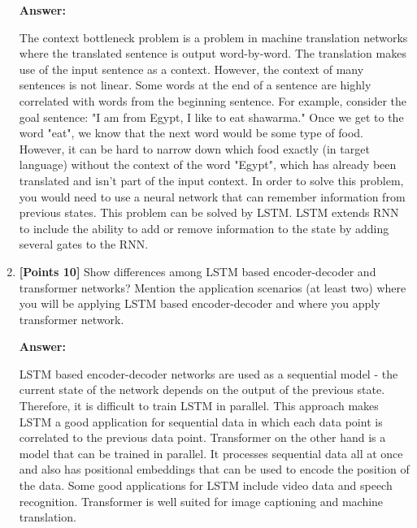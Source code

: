 \documentclass[12pt]{article}
\begin{document}
\begin{enumerate}
          \textbf{Answer:}

          The context bottleneck problem is a problem in machine translation
          networks where the translated sentence is output word-by-word. The
          translation makes use of the input sentence as a context. However, the
          context of many sentences is not linear. Some words at the end of a
          sentence are highly correlated with words from the beginning sentence.
          For example, consider the goal sentence: "I am from Egypt, I like to
          eat shawarma." Once we get to the word "eat", we know that the next
          word would be some type of food. However, it can be hard to narrow
          down which food exactly (in target language) without the context of
          the word "Egypt", which has already been translated and isn't part of
          the input context. In order to solve this problem, you would need to
          use a neural network that can remember information from previous
          states. This problem can be solved by LSTM. LSTM extends RNN to
          include the ability to add or remove information to the state by
          adding several gates to the RNN.

    \item \textbf{[Points 10]} Show differences among LSTM based encoder-decoder
          and transformer networks? Mention the application scenarios (at least
          two) where you will be applying LSTM based encoder-decoder and where
          you apply transformer network.

          \textbf{Answer:}

          LSTM based encoder-decoder networks are used as a sequential model -
          the current state of the network depends on the output of the previous
          state. Therefore, it is difficult to train LSTM in parallel. This
          approach makes LSTM a good application for sequential data in which
          each data point is correlated to the previous data point. Transformer
          on the other hand is a model that can be trained in parallel. It
          processes sequential data all at once and also has positional
          embeddings that can be used to encode the position of the data. Some
          good applications for LSTM include video data and speech recognition.
          Transformer is well suited for image captioning and machine
          translation.


\end{enumerate}
\end{document}
